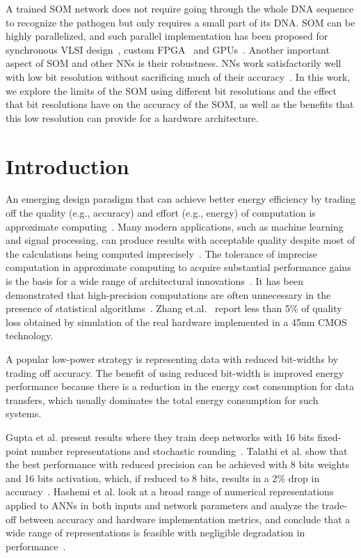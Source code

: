 A trained SOM network does not require going through the whole DNA sequence to recognize the pathogen but only requires a small part of its DNA. SOM can be highly parallelized, and such parallel implementation has been proposed for synchronous VLSI design~\cite{Yang2018RiBoSOM}, custom FPGA~\cite{Porrmann2006} and GPUs~\cite{McConnell2012}. Another important aspect of SOM and other NNs is their robustness. NNs work satisfactorily well with low bit resolution without sacrificing much of their accuracy~\cite{8056820}. In this work, we explore the limits of the SOM using different bit resolutions and the effect that bit resolutions have on the accuracy of the SOM, as well as the benefits that this low resolution can provide for a hardware architecture. 

\section{Introduction}
An emerging design paradigm that can achieve better energy efficiency by trading off the quality (e.g., accuracy) and effort (e.g., energy) of computation is approximate computing~\cite{Zhang2014}. Many modern applications, such as machine learning and signal processing, can produce results with acceptable quality despite most of the calculations being computed imprecisely~\cite{Ye2013}. The tolerance of imprecise computation in approximate computing to acquire substantial performance gains is the basis for a wide range of architectural innovations~\cite{Esmaeilzadeh2012}. It has been demonstrated that high-precision computations are often unnecessary in the presence of statistical algorithms~\cite{Moons2017,Zhang2015}. Zhang et.al.~\cite{Zhang2015} report less than 5\% of quality loss obtained by simulation of the real hardware implemented in a 45nm CMOS technology.

A popular low-power strategy is representing data with reduced bit-widths by trading off accuracy. The benefit of using reduced bit-width is improved energy performance because there is a reduction in the energy cost consumption for data transfers, which usually dominates the total energy consumption for such systems.

Gupta et al. present results where they train deep networks with 16 bits fixed-point number representations and stochastic rounding~\cite{Gupta2015}. Talathi et al. show that the best performance with reduced precision can be achieved with 8 bits weights and 16 bits activation, which, if reduced to 8 bits, results in a 2\% drop in accuracy~\cite{lin2016overcoming}. Hashemi et al. look at a broad range of numerical representations applied to ANNs in both inputs and network parameters and analyze the trade-off between accuracy and hardware implementation metrics, and conclude that a wide range of representations is feasible with negligible degradation in performance~\cite{Hashemi2017}.

